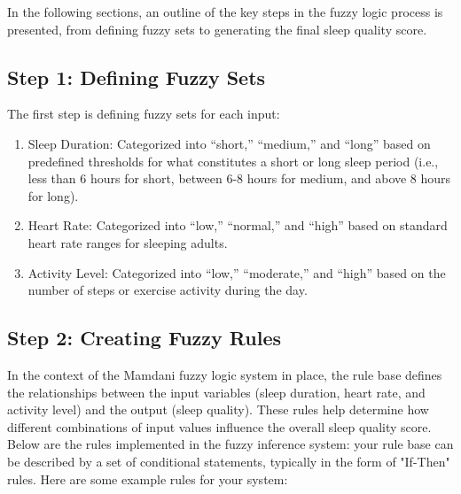 \documentclass[10pt,twocolumn]{article}
\begin{document}
In the following sections, an outline of the key steps in the fuzzy logic process is presented, from defining fuzzy sets to generating the final sleep quality score.

\subsection{Step 1: Defining Fuzzy Sets}
The first step is defining fuzzy sets for each input:

\begin{enumerate}
    \item Sleep Duration: Categorized into “short,” “medium,” and “long” based on predefined thresholds for what constitutes a short or long sleep period (i.e., less than 6 hours for short, between 6-8 hours for medium, and above 8 hours for long).
    \item Heart Rate: Categorized into “low,” “normal,” and “high” based on standard heart rate ranges for sleeping adults.
    \item Activity Level: Categorized into “low,” “moderate,” and “high” based on the number of steps or exercise activity during the day.
\end{enumerate}


\subsection{Step 2: Creating Fuzzy Rules}
In the context of the Mamdani fuzzy logic system in place, the rule base defines the relationships between the input variables (sleep duration, heart rate, and activity level) and the output (sleep quality). These rules help determine how different combinations of input values influence the overall sleep quality score. Below are the rules implemented in the fuzzy inference system:
your rule base can be described by a set of conditional statements, typically in the form of "If-Then" rules. Here are some example rules for your system:
\end{document}
